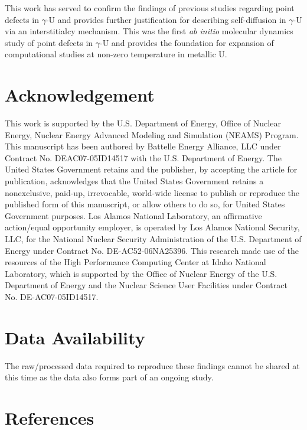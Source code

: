 \documentclass[review]{elsarticle}
\begin{document}
This work has served to confirm the findings of previous studies regarding point defects in $\gamma$-U and provides further justification for describing self-diffusion in $\gamma$-U via an interstitialcy mechanism. This was the first \textit{ab initio} molecular dynamics study of point defects in $\gamma$-U and provides the foundation for expansion of computational studies at non-zero temperature in metallic U. 

\section{Acknowledgement}
This work is supported by the U.S. Department of Energy, Office of Nuclear Energy, Nuclear Energy Advanced Modeling and Simulation (NEAMS) Program. This manuscript has been authored by Battelle Energy Alliance, LLC under Contract No. DEAC07-05ID14517 with the U.S. Department of Energy. The United States Government retains and the publisher, by accepting the article for publication, acknowledges that the United States Government retains a nonexclusive, paid-up, irrevocable, world-wide license to publish or reproduce the published form of this manuscript, or allow others to do so, for United States Government purposes.  Los Alamos National Laboratory, an affirmative action/equal opportunity employer, is operated by Los Alamos National Security, LLC, for the National Nuclear Security Administration of the U.S. Department of Energy under Contract No. DE-AC52-06NA25396.  This research made use of the resources of the High Performance Computing Center at Idaho National Laboratory, which is supported by the Office of Nuclear Energy of the U.S. Department of Energy and the Nuclear Science User Facilities under Contract No. DE-AC07-05ID14517.

\section{Data Availability}

The raw/processed data required to reproduce these findings cannot be shared at this time as the data also forms part of an ongoing study.

\section{References}


\end{document}
